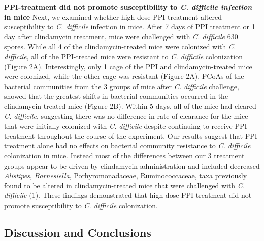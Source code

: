 \documentclass[11pt,]{article}
\begin{document}
\textbf{PPI-treatment did not promote susceptibility to \emph{C.
difficile infection} in mice} Next, we examined whether high dose PPI
treatment altered susceptibility to \emph{C. difficile} infection in
mice. After 7 days of PPI treatment or 1 day after clindamycin
treatment, mice were challenged with \emph{C. difficile} 630 spores.
While all 4 of the clindamycin-treated mice were colonized with \emph{C.
difficile}, all of the PPI-treated mice were resistant to \emph{C.
difficile} colonization (Figure 2A). Interestingly, only 1 cage of the
PPI and clindamycin-treated mice were colonized, while the other cage
was resistant (Figure 2A). PCoAs of the bacterial communities from the 3
groups of mice after \emph{C. difficile} challenge, showed that the
greatest shifts in bacterial communities occurred in the
clindamycin-treated mice (Figure 2B). Within 5 days, all of the mice had
cleared \emph{C. difficile}, suggesting there was no difference in rate
of clearance for the mice that were initially colonized with \emph{C.
difficile} despite continuing to receive PPI treatment throughout the
course of the experiment. Our results suggest that PPI treatment alone
had no effects on bacterial community resistance to \emph{C. difficile}
colonization in mice. Instead most of the differences between our 3
treatment groups appear to be driven by clindamycin administration and
included decreased \emph{Alistipes}, \emph{Barnesiella},
Porhyromonadaceae, Ruminococcaceae, taxa previously found to be altered
in clindamycin-treated mice that were challenged with \emph{C.
difficile} (1). These findings demonstrated that high dose PPI treatment
did not promote susceptibility to \emph{C. difficile} colonization.

\subsection{Discussion and
Conclusions}\label{discussion-and-conclusions}
\end{document}
